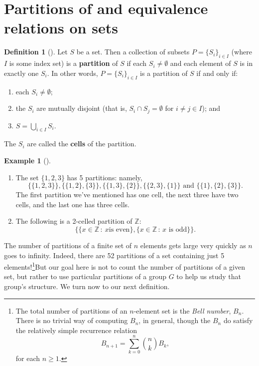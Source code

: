 \documentclass[10pt,]{book}
\newcommand{\terminology}[1]{\textbf{#1}}
\theoremstyle{plain}
\theoremstyle{definition}
\newtheorem{definition}[theorem]{Definition}
\theoremstyle{definition}
\theoremstyle{definition}
\newtheorem{example}[theorem]{Example}
\theoremstyle{definition}
\numberwithin{equation}{section}
\def\Z{\mathbb{Z}}
\begin{document}
\section[{Partitions of and equivalence relations on sets}]{Partitions of and equivalence relations on sets}\label{section-22}
\begin{definition}[{}]\label{definition-54}
Let \(S\) be a set. Then a collection of subsets \(P=\{S_i\}_{i\in I}\) (where \(I\) is some index set) is a \terminology{partition} of \(S\) if each \(S_i \neq \emptyset\) and each element of \(S\) is in exactly one \(S_i\). In other words, \(P=\{S_i\}_{i\in I}\) is a partition of \(S\) if and only if: \leavevmode%
\begin{enumerate}
\item\hypertarget{li-373}{}each \(S_i\neq \emptyset\);%
\item\hypertarget{li-374}{}the \(S_i\) are mutually disjoint (that is, \(S_i\cap S_j =
\emptyset\) for \(i\neq j \in I\)); and%
\item\hypertarget{li-375}{}\(S=\bigcup_{i\in I}S_i\).%
\end{enumerate}
%
\par
The \(S_i\) are called the \terminology{cells} of the partition.%
\end{definition}
\begin{example}[]\label{example-63}
\leavevmode%
\begin{enumerate}
\item\hypertarget{li-376}{}The set \(\{1,2,3\}\) has 5 partitions: namely,%
\begin{equation*}
\{\{1,2,3\}\},\{\{1,2\},\{3\}\}, \{\{1,3\},\{2\}\},\{\{2,3\},\{1\}\} \mbox{ and }  \{\{1\},\{2\},\{3\}\}.
\end{equation*}
The first partition we've mentioned has one cell, the next three have two cells, and the last one has three cells.%
\item\hypertarget{li-377}{}The following is a 2-celled partition of \(\Z\):%
\begin{equation*}
\{\{x\in \Z\,:\ x \mbox{
is even} \},\{x\in \Z\,:\, x\mbox{ is odd} \}\}.
\end{equation*}
%
\end{enumerate}
\end{example}
The number of partitions of a finite set of \(n\) elements gets large very quickly as \(n\) goes to infinity. Indeed, there are 52 partitions of a set containing just 5 elements!\footnote{The total number of partitions of an \(n\)-element set is the \emph{Bell number}, \(B_n\). There is no trivial way of computing \(B_n\), in general, though the \(B_n\) do satisfy the relatively simple recurrence relation%
\begin{equation*}
B_{n+1}=\sum_{k=0}^n \binom{n}{k} B_k,
\end{equation*}
for each \(n\geq 1\).\label{fn-5}}But our goal here is not to count the number of partitions of a given set, but rather to use particular partitions of a group \(G\) to help us study that group's structure. We turn now to our next definition.%
\end{document}
